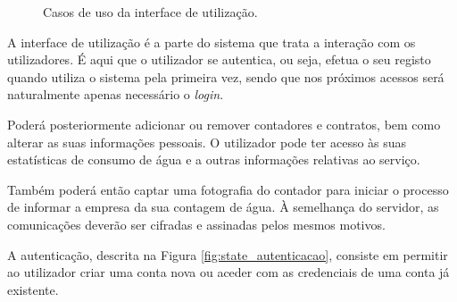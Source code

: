 \begin{figure}[h!]
\begin{center}
\caption{Casos de uso da interface de utilização.}
\label{fig:uso_iu}
\end{center}
\end{figure}

A interface de utilização é a parte do sistema que trata a interação com os utilizadores. É aqui que o utilizador se autentica, ou seja, efetua o seu registo quando utiliza o sistema pela primeira vez, sendo que nos próximos acessos será naturalmente apenas necessário o {\textit{login}}.\par
Poderá posteriormente adicionar ou remover contadores e contratos, bem como alterar as suas informações pessoais. O utilizador pode ter acesso às suas estatísticas de consumo de água e a outras informações relativas ao serviço.\par
Também poderá então captar uma fotografia do contador para iniciar o processo de informar a empresa da sua contagem de água. À semelhança do servidor, as comunicações deverão ser cifradas e assinadas pelos mesmos motivos.\par

A autenticação, descrita na Figura \ref{fig:state_autenticacao}, consiste em permitir ao utilizador criar uma conta nova ou aceder com as credenciais de uma conta já existente.

